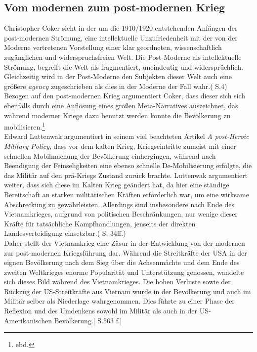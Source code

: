 \documentclass[11pt,a4paper,oneside,numbers=noenddot,bibliography=totocnumbered,DIV=13]{scrartcl}
\begin{document}
\subsection{Vom modernen zum post-modernen Krieg}
Christopher Coker sieht in der um die 1910/1920 entstehenden Anfängen der post-modernen Strömung, eine intellektuelle Unzufriedenheit mit der von der Moderne vertretenen Vorstellung einer klar geordneten, wissenschaftlich zugänglichen und widerspruchsfreien Welt. Die Post-Moderne als intellektuelle Strömung, begreift die Welt als fragmentiert, uneindeutig und widersprüchlich. Gleichzeitig wird in der Post-Moderne den Subjekten dieser Welt auch eine größere \textit{agency} zugeschrieben als dies in der Moderne der Fall wahr.(\cite{coker_collision_2012} S.4)\\
Bezogen auf den post-modernen Krieg argumentiert Coker, dass dieser sich sich ebenfalls durch eine Auflösung eines großen Meta-Narratives auszeichnet, das während moderner Kriege dazu benutzt werden konnte die Bevölkerung zu mobilisieren.\footnote{ebd.}\\
Edward Luttenwak argumentiert in seinem viel beachteten Artikel \textit{A post-Heroic Military Policy}, dass vor dem kalten Krieg, Kriegseintritte zumeist mit einer schnellen Mobilmachung der Bevölkerung einhergingen, während nach Beendigung der Feinseligkeiten eine ebenso schnelle De-Mobilisierung erfolgte, die das Militär auf den prä-Kriegs Zustand zurück brachte. Luttenwak argumentiert weiter, dass sich diese im Kalten Krieg geändert hat, da hier eine ständige Bereitschaft an starken militärischen Kräften erforderlich war, um eine wirksame Abschreckung zu gewährleisten. Allerdings sind insbesondere nach Ende des Vietnamkrieges, aufgrund von politischen Beschränkungen, nur wenige dieser Kräfte für tatsächliche Kampfhandlungen, jenseits der direkten Landesverteidigung einsetzbar.(\cite{Luttwak1996} S. 34ff.)\\
Daher stellt der Vietnamkrieg eine Zäsur in der Entwicklung von der modernen zur post-modernen Kriegsführung dar. Während die Streitkräfte der USA in der eignen Bevölkerung nach dem Sieg über die Achsenmächte und dem Ende des zweiten Weltkrieges enorme Popularität und Unterstützung genossen, wandelte sich dieses Bild während des Vietnamkrieges. Die hohen Verluste sowie der Rückzug der US-Streitkräfte aus Vietnam wurde in der Bevölkerung und auch im Militär selber als Niederlage wahrgenommen. Dies führte zu einer Phase der Reflexion und des Umdenkens sowohl im Militär als auch in der US-Amerikanischen Bevölkerung.[\cite{olson_war_2007} S.563 f.]\\
\end{document}
